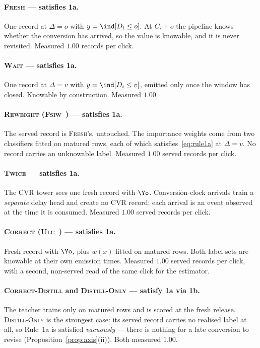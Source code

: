 \paragraph{\textsc{Fresh} --- satisfies 1a.} One record at $\Delta=o$ with $y=\ind[D_i\le o]$. At
$C_i+o$ the pipeline knows whether the conversion has arrived, so the value is knowable, and it is
never revisited. Measured $1.00$ records per click.

\paragraph{\textsc{Wait} --- satisfies 1a.} One record at $\Delta=v$ with $y=\ind[D_i\le v]$,
emitted only once the window has closed. Knowable by construction. Measured $1.00$.

\paragraph{\textsc{Reweight} (\textsc{Fsiw}~\cite{yasui2020feedback}) --- satisfies 1a.} The served record is
\textsc{Fresh}'s, untouched. The importance weights come from two classifiers fitted on matured
rows, each of which satisfies~\eqref{eq:rule1a} at $\Delta=v$. No record carries an unknowable
label. Measured $1.00$ served records per click.

\paragraph{\textsc{Twice} --- satisfies 1a.} The CVR tower sees one fresh record with $\Yo$.
Conversion-clock arrivals train a \emph{separate} delay head and create no CVR record; each arrival
is an event observed at the time it is consumed. Measured $1.00$ served records per click.

\paragraph{\textsc{Correct} (\textsc{Ulc}~\cite{wang2023unbiased}) --- satisfies 1a.} Fresh record with $\Yo$, plus $w(x)$
fitted on matured rows. Both label sets are knowable at their own emission times. Measured $1.00$
served records per click, with a second, non-served read of the same click for the estimator.

\paragraph{\textsc{Correct-Distill} and \textsc{Distill-Only} --- satisfy 1a via 1b.} The teacher
trains only on matured rows and is scored at the fresh release.
\textsc{Distill-Only} is the strongest case: its served record carries no realised label at all, so
Rule~1a is satisfied \emph{vacuously} --- there is nothing for a late conversion to revise
(Proposition~\ref{prop:axis}(ii)). Both measured $1.00$.

